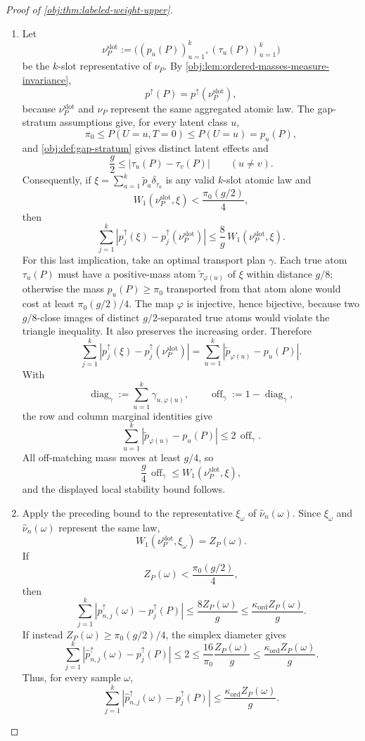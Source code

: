 \documentclass[11pt]{article}
\begin{document}
\begin{proof}[Proof of \cref{obj:thm:labeled-weight-upper}]
\begin{enumerate}
\item
Let
\[
\nu_P^{\mathrm{slot}}
:=
\bigl((p_u(P))_{u=1}^k,(\tau_u(P))_{u=1}^k\bigr)
\]
be the \(k\)-slot representative of \(\nu_P\).  By \cref{obj:lem:ordered-masses-measure-invariance},
\[
p^{\uparrow}(P)=p^{\uparrow}\!\left(\nu_P^{\mathrm{slot}}\right),
\]
because \(\nu_P^{\mathrm{slot}}\) and \(\nu_P\) represent the same aggregated atomic law.  The gap-stratum assumptions give, for every latent class \(u\),
\[
\pi_0\le P(U=u,T=0)\le P(U=u)=p_u(P),
\]
and \cref{obj:def:gap-stratum} gives distinct latent effects and
\[
\frac g2\le |\tau_u(P)-\tau_v(P)|\qquad (u\ne v).
\]
Consequently, if \(\xi=\sum_{a=1}^k \widetilde p_a\delta_{\widetilde\tau_a}\) is any valid \(k\)-slot atomic law and
\[
W_1\!\left(\nu_P^{\mathrm{slot}},\xi\right)
<
\frac{\pi_0(g/2)}{4},
\]
then
\[
\sum_{j=1}^k
\left|p_j^{\uparrow}(\xi)-p_j^{\uparrow}(\nu_P^{\mathrm{slot}})\right|
\le
\frac{8}{g}\,
W_1\!\left(\nu_P^{\mathrm{slot}},\xi\right).
\]
For this last implication, take an optimal transport plan \(\gamma\).  Each true atom \(\tau_u(P)\) must have a positive-mass atom \(\widetilde\tau_{\varphi(u)}\) of \(\xi\) within distance \(g/8\); otherwise the mass \(p_u(P)\ge\pi_0\) transported from that atom alone would cost at least \(\pi_0(g/2)/4\).  The map \(\varphi\) is injective, hence bijective, because two \(g/8\)-close images of distinct \(g/2\)-separated true atoms would violate the triangle inequality.  It also preserves the increasing order.  Therefore
\[
\sum_{j=1}^k
\left|p_j^{\uparrow}(\xi)-p_j^{\uparrow}(\nu_P^{\mathrm{slot}})\right|
=
\sum_{u=1}^k
\left|\widetilde p_{\varphi(u)}-p_u(P)\right|.
\]
With
\[
\operatorname{diag}_{\gamma}:=\sum_{u=1}^k\gamma_{u,\varphi(u)},
\qquad
\operatorname{off}_{\gamma}:=1-\operatorname{diag}_{\gamma},
\]
the row and column marginal identities give
\[
\sum_{u=1}^k
\left|\widetilde p_{\varphi(u)}-p_u(P)\right|
\le 2\,\operatorname{off}_{\gamma}.
\]
All off-matching mass moves at least \(g/4\), so
\[
\frac g4\,\operatorname{off}_{\gamma}
\le W_1\!\left(\nu_P^{\mathrm{slot}},\xi\right),
\]
and the displayed local stability bound follows. %

\item
Apply the preceding bound to the representative \(\xi_\omega\) of \(\widehat\nu_n(\omega)\).  Since \(\xi_\omega\) and \(\widehat\nu_n(\omega)\) represent the same law,
\[
W_1\!\left(\nu_P^{\mathrm{slot}},\xi_\omega\right)=Z_P(\omega).
\]
If
\[
Z_P(\omega)<\frac{\pi_0(g/2)}4,
\]
then
\[
\sum_{j=1}^k
\left|\widehat p_{n,j}^{\uparrow}(\omega)-p_j^{\uparrow}(P)\right|
\le
\frac{8 Z_P(\omega)}{g}
\le
\frac{\kappa_{\mathrm{ord}} Z_P(\omega)}{g}.
\]
If instead \(Z_P(\omega)\ge \pi_0(g/2)/4\), the simplex diameter gives
\[
\sum_{j=1}^k
\left|\widehat p_{n,j}^{\uparrow}(\omega)-p_j^{\uparrow}(P)\right|
\le 2
\le
\frac{16}{\pi_0}\frac{Z_P(\omega)}{g}
\le
\frac{\kappa_{\mathrm{ord}} Z_P(\omega)}{g}.
\]
Thus, for every sample \(\omega\),
\[
\sum_{j=1}^k
\left|\widehat p_{n,j}^{\uparrow}(\omega)-p_j^{\uparrow}(P)\right|
\le
\frac{\kappa_{\mathrm{ord}} Z_P(\omega)}{g}.
\] %


\end{enumerate}
\end{proof}
\end{document}
